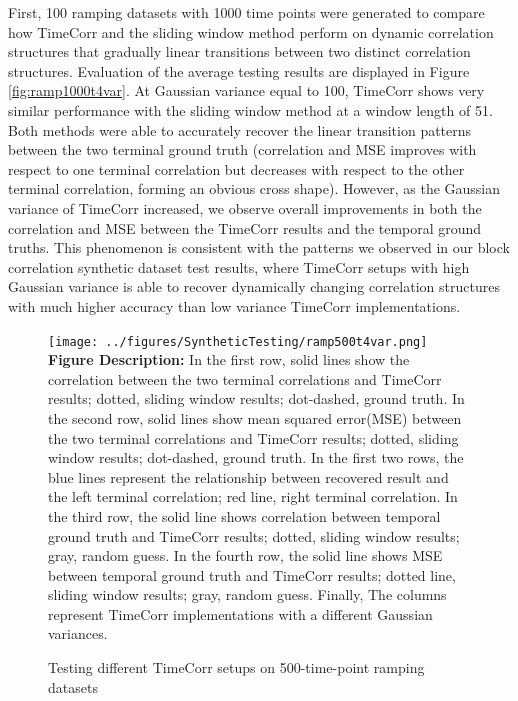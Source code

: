 \documentclass[11pt]{article}
\begin{document}
First, 100 ramping datasets with 1000 time points were generated to compare how TimeCorr and the sliding window method perform on dynamic correlation structures that gradually linear transitions between two distinct correlation structures. Evaluation of the average testing results are displayed in Figure \ref{fig:ramp1000t4var}. At Gaussian variance equal to 100, TimeCorr shows very similar performance with the sliding window method at a window length of 51. Both methods were able to accurately recover the linear transition patterns between the two terminal ground truth (correlation and MSE improves with respect to one terminal correlation but decreases with respect to the other terminal correlation, forming an obvious cross shape). However, as the Gaussian variance of TimeCorr increased, we observe overall improvements in both the correlation and MSE between the TimeCorr results and the temporal ground truths. This phenomenon is consistent with the patterns we observed in our block correlation synthetic dataset test results, where TimeCorr setups with high Gaussian variance is able to recover dynamically changing correlation structures with much higher accuracy than low variance TimeCorr implementations.

\begin{figure}[!htb]
\caption{Testing different TimeCorr setups on 500-time-point ramping datasets}
\texttt{[image: ../figures/SyntheticTesting/ramp500t4var.png]}
\label{fig:ramp500t4var}
\small{\textbf{Figure Description:} In the first row, solid lines show the correlation between the two terminal correlations and TimeCorr results; dotted, sliding window results; dot-dashed, ground truth. In the second row, solid lines show mean squared error(MSE) between the two terminal correlations and TimeCorr results; dotted, sliding window results; dot-dashed, ground truth. In the first two rows, the blue lines represent the relationship between recovered result and the left terminal correlation; red line, right terminal correlation. In the third row, the solid line shows correlation between temporal ground truth and TimeCorr results; dotted, sliding window results; gray, random guess. In the fourth row, the solid line shows MSE between temporal ground truth and TimeCorr results; dotted line, sliding window results; gray, random guess. Finally, The columns represent TimeCorr implementations with a different Gaussian variances.}
\end{figure}
\end{document}
